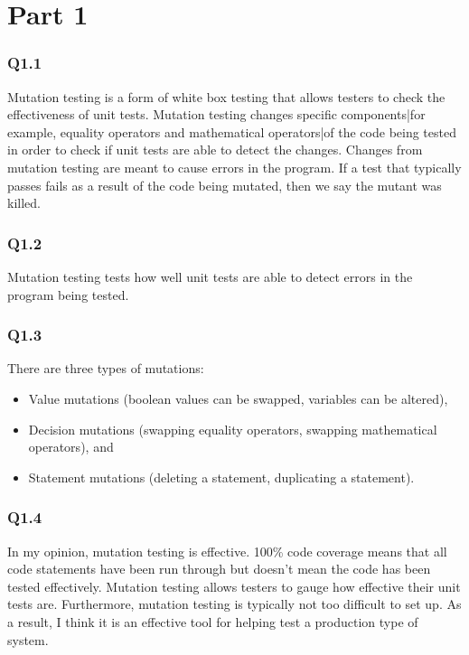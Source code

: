 \documentclass[12pt, letterpaper, titlepage]{article}
\title{\textbf{\Huge{
    \begin{center}
        ECE 322 Lab Report \#6
    \end{center}
}}}
\author{
\B enjamin Kong \\
1573684 \\
}
\begin{document}
 
\onehalfspacing

\maketitle
\newpage

\section*{Part 1}
\subsubsection*{Q1.1}
Mutation testing is a form of white box testing that allows testers to check the effectiveness of unit tests. Mutation testing changes specific components|for example, equality operators and mathematical operators|of the code being tested in order to check if unit tests are able to detect the changes. Changes from mutation testing are meant to cause errors in the program. If a test that typically passes fails as a result of the code being mutated, then we say the mutant was killed.

\subsubsection*{Q1.2}
Mutation testing tests how well unit tests are able to detect errors in the program being tested. 

\subsubsection*{Q1.3}
There are three types of mutations:
\begin{itemize}
    \item Value mutations (boolean values can be swapped, variables can be altered),
    \item Decision mutations (swapping equality operators, swapping mathematical operators), and
    \item Statement mutations (deleting a statement, duplicating a statement).
\end{itemize}

\subsubsection*{Q1.4}
In my opinion, mutation testing is effective. 100\% code coverage means that all code statements have been run through but doesn't mean the code has been tested effectively. Mutation testing allows testers to gauge how effective their unit tests are. Furthermore, mutation testing is typically not too difficult to set up. As a result, I think it is an effective tool for helping test a production type of system.
\end{document}

